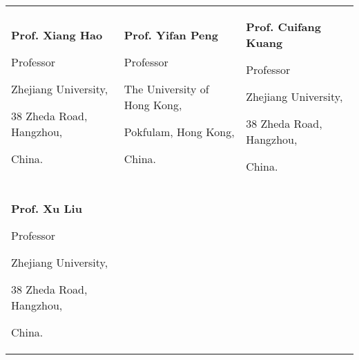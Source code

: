 

\begin{tabularx}{\textwidth}{@{}X X X@{}}
\textbf{Prof. Xiang Hao}\par
Professor\par
Zhejiang University,\par
38 Zheda Road, Hangzhou, \par China.\par
\makefield{\faEnvelope}{\url{haox@zju.edu.cn}}
&
\textbf{Prof. Yifan Peng}\par
Professor\par
The University of Hong Kong,\par
Pokfulam, Hong Kong, \par China.\par
\makefield{\faEnvelope}{\url{evanpeng@hku.hk}}
&
\textbf{Prof. Cuifang Kuang}\par
Professor\par
Zhejiang University,\par
38 Zheda Road, Hangzhou, \par China.\par
\makefield{\faEnvelope}{\url{cfkuang@zju.edu.cn}}
\\
\textbf{Prof. Xu Liu}\par
Professor\par
Zhejiang University,\par
38 Zheda Road, Hangzhou, \par China.\par
\makefield{\faEnvelope}{\url{liuxu@zju.edu.cn}}
&

&

\end{tabularx}
